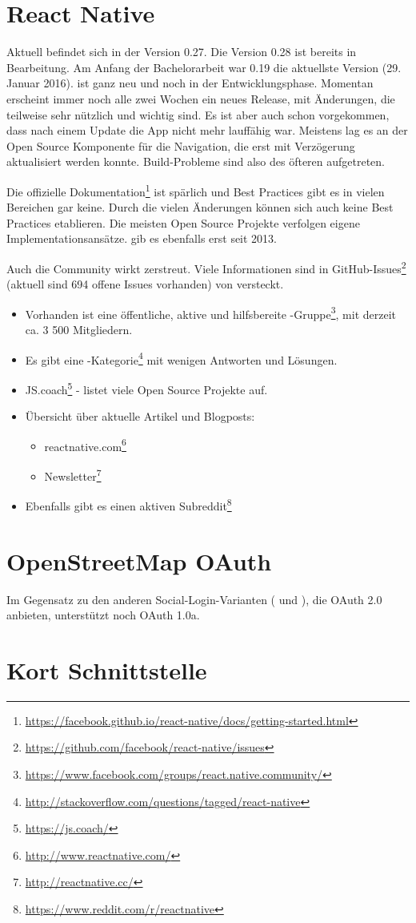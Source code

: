 \section{React Native}
Aktuell befindet sich  in der Version 0.27.
Die Version 0.28 ist bereits in Bearbeitung.
Am Anfang der Bachelorarbeit war 0.19 die aktuellste Version (29. Januar 2016).
 ist ganz neu und noch in der Entwicklungsphase.
Momentan erscheint immer noch alle zwei Wochen ein neues Release, mit Änderungen, die teilweise sehr nützlich und wichtig sind.
Es ist aber auch schon vorgekommen, dass nach einem Update die App nicht mehr lauffähig war.
Meistens lag es an der Open Source Komponente für die Navigation, die erst mit Verzögerung aktualisiert werden konnte.
Build-Probleme sind also des öfteren aufgetreten.

Die offizielle Dokumentation\footnote{\url{https://facebook.github.io/react-native/docs/getting-started.html}} ist spärlich und Best Practices gibt es in vielen Bereichen gar keine.
Durch die vielen Änderungen können sich auch keine Best Practices etablieren.
 Die meisten Open Source Projekte verfolgen eigene Implementationsansätze.
 gib es ebenfalls erst seit 2013.

Auch die Community wirkt zerstreut. 
Viele Informationen sind in GitHub-Issues\footnote{\url{https://github.com/facebook/react-native/issues}} (aktuell sind 694 offene Issues vorhanden) von  versteckt.

\begin{itemize}
	\item Vorhanden ist eine öffentliche, aktive und hilfsbereite -Gruppe\footnote{\url{https://www.facebook.com/groups/react.native.community/}}, mit derzeit ca. 3 500 Mitgliedern.
	\item Es gibt eine -Kategorie\footnote{\url{http://stackoverflow.com/questions/tagged/react-native}} mit wenigen Antworten und Lösungen.
	\item JS.coach\footnote{\url{https://js.coach/}} - listet viele Open Source Projekte auf.
	\item Übersicht über aktuelle Artikel und Blogposts: 
	\begin{itemize}
		\item reactnative.com\footnote{\url{http://www.reactnative.com/}}
		\item {} Newsletter\footnote{\url{http://reactnative.cc/}}
	\end{itemize}
	\item Ebenfalls gibt es einen aktiven Subreddit\footnote{\url{https://www.reddit.com/r/reactnative}}
\end{itemize}


\section{OpenStreetMap OAuth}
Im Gegensatz zu den anderen Social-Login-Varianten ( und ), die OAuth 2.0 anbieten, unterstützt  noch OAuth 1.0a.


\section{Kort Schnittstelle}

